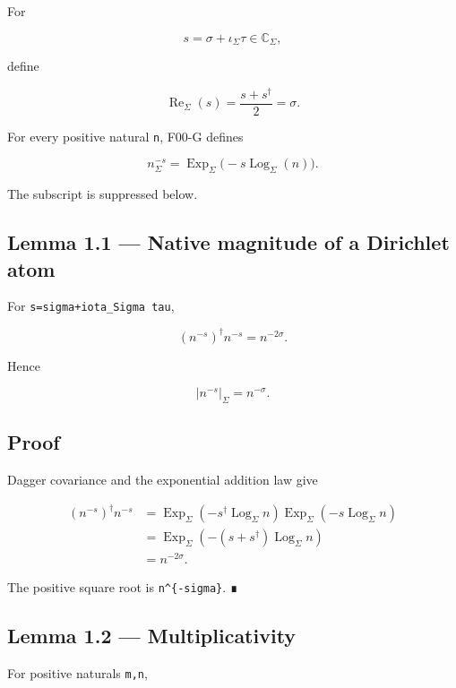 For

\[
s=\sigma+\iota_\Sigma\tau\in\mathbb C_\Sigma,
\]

define

\[
\operatorname{Re}_\Sigma(s)
=\frac{s+s^\dagger}{2}=\sigma.
\]

For every positive natural \texttt{n}, F00-G defines

\[
\boxed{
n^{-s}_\Sigma
=
\operatorname{Exp}_\Sigma
\bigl(-s\operatorname{Log}_\Sigma(n)\bigr).
}
\]

The subscript is suppressed below.

\hypertarget{lemma-1.1-native-magnitude-of-a-dirichlet-atom}{%
\subsection{Lemma 1.1 --- Native magnitude of a Dirichlet atom}\label{lemma-1.1-native-magnitude-of-a-dirichlet-atom}}

For \texttt{s=sigma+iota\_Sigma\ tau},

\[
\boxed{
(n^{-s})^\dagger n^{-s}=n^{-2\sigma}.
}
\]

Hence

\[
|n^{-s}|_\Sigma=n^{-\sigma}.
\]

\hypertarget{proof}{%
\subsection{Proof}\label{proof}}

Dagger covariance and the exponential addition law give

\[
\begin{aligned}
(n^{-s})^\dagger n^{-s}
&=
\operatorname{Exp}_\Sigma
(-s^\dagger\operatorname{Log}_\Sigma n)
\operatorname{Exp}_\Sigma
(-s\operatorname{Log}_\Sigma n)\\
&=
\operatorname{Exp}_\Sigma
(-(s+s^\dagger)\operatorname{Log}_\Sigma n)\\
&=n^{-2\sigma}.
\end{aligned}
\]

The positive square root is \texttt{n\^{}\{-sigma\}}. ∎

\hypertarget{lemma-1.2-multiplicativity}{%
\subsection{Lemma 1.2 --- Multiplicativity}\label{lemma-1.2-multiplicativity}}

For positive naturals \texttt{m,n},

